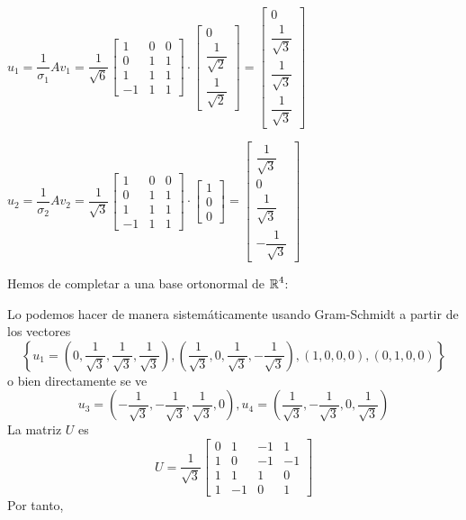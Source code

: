 $u_1=\dfrac{1}{\sigma_1}Av_1=\dfrac{1}{\sqrt{6}}\begin{bmatrix}
	1 & 0 & 0 \\
	0 & 1 & 1 \\
	1 & 1 & 1 \\
	-1 & 1 & 1
\end{bmatrix}\cdot\begin{bmatrix}
0\\
\dfrac{1}{\sqrt{2}}\\
\dfrac{1}{\sqrt{2}}
\end{bmatrix}=\begin{bmatrix}
0\\
\dfrac{1}{\sqrt{3}}\\
\dfrac{1}{\sqrt{3}}\\
\dfrac{1}{\sqrt{3}}
\end{bmatrix}$

$u_2=\dfrac{1}{\sigma_2}Av_2=\dfrac{1}{\sqrt{3}}\begin{bmatrix}
	1 & 0 & 0 \\
	0 & 1 & 1 \\
	1 & 1 & 1 \\
	-1 & 1 & 1
\end{bmatrix}\cdot\begin{bmatrix}
1\\
0\\
0
\end{bmatrix}=\begin{bmatrix}
\dfrac{1}{\sqrt{3}}\\
0\\
\dfrac{1}{\sqrt{3}}\\
-\dfrac{1}{\sqrt{3}}
\end{bmatrix}$

Hemos de completar a una base ortonormal de $\operatorname{\mathbb{R}}^4$:

Lo podemos hacer de manera sistemáticamente usando Gram-Schmidt a partir de los vectores \[ \left\{u_1=\left(0,\dfrac{1}{\sqrt{3}},\dfrac{1}{\sqrt{3}},\dfrac{1}{\sqrt{3}}\right),\left(\dfrac{1}{\sqrt{3}},0,\dfrac{1}{\sqrt{3}},-\dfrac{1}{\sqrt{3}}\right),(1,0,0,0),(0,1,0,0)\right\} \]o bien directamente se ve \[ u_3=\left(-\dfrac{1}{\sqrt{3}},-\dfrac{1}{\sqrt{3}},\dfrac{1}{\sqrt{3}},0\right), u_4=\left(\dfrac{1}{\sqrt{3}},-\dfrac{1}{\sqrt{3}},0,\dfrac{1}{\sqrt{3}}\right) \]La matriz $U$ es \[ U=\dfrac{1}{\sqrt{3}}\begin{bmatrix}
	0 & 1 & -1 & 1 \\
	1 & 0 & -1 & -1 \\
	1 & 1 & 1 & 0 \\
	1 & -1 & 0 & 1
\end{bmatrix} \]Por tanto,

